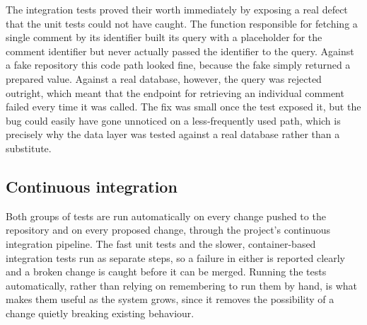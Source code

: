 \par The integration tests proved their worth immediately by exposing a real defect that the unit tests could not have caught. The function responsible for fetching a single comment by its identifier built its query with a placeholder for the comment identifier but never actually passed the identifier to the query. Against a fake repository this code path looked fine, because the fake simply returned a prepared value. Against a real database, however, the query was rejected outright, which meant that the endpoint for retrieving an individual comment failed every time it was called. The fix was small once the test exposed it, but the bug could easily have gone unnoticed on a less-frequently used path, which is precisely why the data layer was tested against a real database rather than a substitute.

\subsection{Continuous integration}

\par Both groups of tests are run automatically on every change pushed to the repository and on every proposed change, through the project's continuous integration pipeline. The fast unit tests and the slower, container-based integration tests run as separate steps, so a failure in either is reported clearly and a broken change is caught before it can be merged. Running the tests automatically, rather than relying on remembering to run them by hand, is what makes them useful as the system grows, since it removes the possibility of a change quietly breaking existing behaviour.
